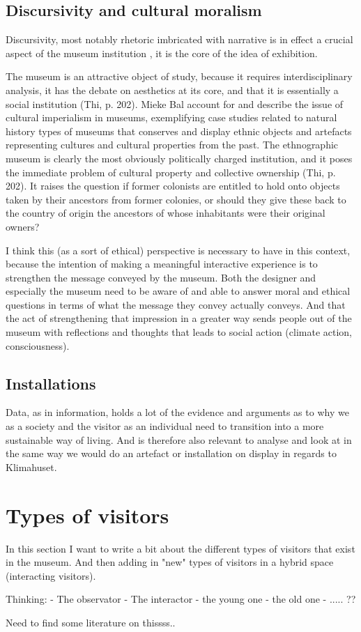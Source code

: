 \subsection{Discursivity and cultural moralism}
Discursivity, most notably rhetoric imbricated with narrative is in effect a crucial aspect of the museum institution \autocite[p. 205]{Thi_book}, it is the core of the idea of exhibition.

The museum is an attractive object of study, because it requires interdisciplinary analysis, it has the debate on aesthetics at its core, and that it is essentially a social institution (Thi, p. 202). Mieke Bal account for and describe the issue of cultural imperialism in museums, exemplifying case studies related to natural history types of museums that conserves and display ethnic objects and artefacts representing cultures and cultural properties from the past. The ethnographic museum is clearly the most obviously politically charged institution, and it poses the immediate problem of cultural property and collective ownership (Thi, p. 202). It raises the question if former colonists are entitled to hold onto objects taken by their ancestors from former colonies, or should they give these back to the country of origin the ancestors of whose inhabitants were their original owners?

I think this (as a sort of ethical) perspective is necessary to have in this context, because the intention of making a meaningful interactive experience is to strengthen the message conveyed by the museum. Both the designer and especially the museum need to be aware of and able to answer moral and ethical questions in terms of what the message they convey actually conveys. And that the act of strengthening that impression in a greater way sends people out of the museum with reflections and thoughts that leads to social action (climate action, consciousness). 




\subsection{Installations}
Data, as in information, holds a lot of the evidence and arguments as to why we as a society and the visitor as an individual need to transition into a more sustainable way of living. And is therefore also relevant to analyse and look at in the same way we would do an artefact or installation on display in regards to Klimahuset.



\section{Types of visitors}
In this section I want to write a bit about the different types of visitors that exist in the museum. And then adding in "new" types of visitors in a hybrid space (interacting visitors).

Thinking:
- The observator
- The interactor
- the young one
- the old one
- ..... ??

\par Need to find some literature on thissss..